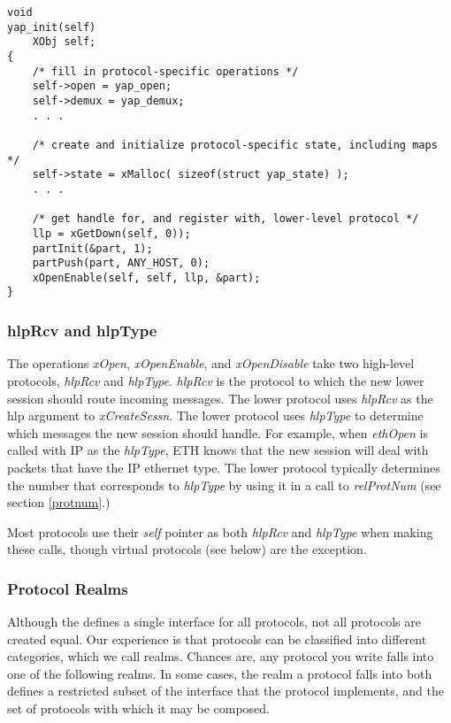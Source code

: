 \begin{verbatim}
void
yap_init(self)
    XObj self;
{
    /* fill in protocol-specific operations */
    self->open = yap_open;
    self->demux = yap_demux;
    . . .

    /* create and initialize protocol-specific state, including maps */
    self->state = xMalloc( sizeof(struct yap_state) );
    . . .

    /* get handle for, and register with, lower-level protocol */
    llp = xGetDown(self, 0));
    partInit(&part, 1);
    partPush(part, ANY_HOST, 0);
    xOpenEnable(self, self, llp, &part);
}
\end{verbatim}



\subsubsection{hlpRcv and hlpType}
\label{hlpdesc}

The operations {\em xOpen}, {\em xOpenEnable}, and {\em xOpenDisable}
take two high-level protocols, {\em hlpRcv} and {\em hlpType}.  {\em
hlpRcv} is the protocol to which the new lower session should route
incoming messages.  The lower protocol uses {\em hlpRcv} as the hlp
argument to {\em xCreateSessn}. The lower protocol uses {\em hlpType}
to determine which messages the new session should handle.  For
example, when {\em ethOpen} is called with IP as the {\em hlpType},
ETH knows that the new session will deal with packets that have the IP
ethernet type.  The lower protocol typically determines the number
that corresponds to {\em hlpType} by using it in a call to {\em
relProtNum} (see section \ref{protnum}.)

Most protocols use their {\em self} pointer as both {\em hlpRcv} and
{\em hlpType} when making these calls, though virtual protocols (see
below) are the exception.

\subsubsection{Protocol Realms}

Although the \xk{} defines a single interface for all protocols, not
all protocols are created equal. Our experience is that protocols can
be classified into different categories, which we call realms. Chances
are, any protocol you write falls into one of the following realms. In
some cases, the realm a protocol falls into both defines a restricted
subset of the interface that the protocol implements, and the set of
protocols with which it may be composed.

